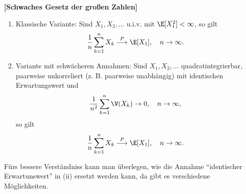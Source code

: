 \begin{satz}\label{schwaches}
 \textbf{[Schwaches Gesetz der großen Zahlen]}
	\begin{enumerate}[label=(\roman*)]
		\item Klassische Variante: Sind $X_1,X_2,...$ u.i.v. mit $\E[X_1^2] < \infty$, so gilt
		\[ \frac{1}{n} \sum_{k=1}^{n} X_k \overset{P}{\longrightarrow} \E[X_1], \quad n \to \infty. \]
		\item Variante mit schw\"acheren Annahmen: Sind $X_1,X_2,...$ quadratintegrierbar, paarweise unkorreliert (z. B. paarweise unabh\"angig) mit identischen Erwartungswert und
		\begin{align}
		 \frac{1}{n^2} \sum\limits_{k=1}^{n} \V(X_k) \to 0,\quad n\to\infty, \label{F1}
		\end{align}
		so gilt
		\[ \frac{1}{n} \sum_{k=1}^{n} X_k \overset{P}{\longrightarrow} \E[X_1], \quad n \to \infty. \]
	\end{enumerate}
\end{satz}
F\"urs bessere Verst\"andniss kann man \"uberlegen, wie die Annahme \enquote{identischer Erwartunswert} in (ii) ersetzt werden kann, da gibt es verschiedene M\"oglichkeiten. 
